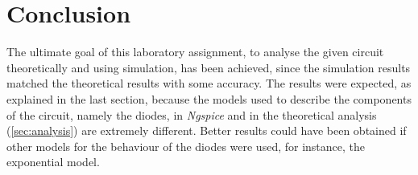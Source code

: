 %             
%             







\section{Conclusion}
\label{sec:conclusion}


The ultimate goal of this laboratory assignment, to analyse
the given circuit theoretically and using simulation, has been achieved, since
the simulation results matched the theoretical results with some accuracy.
The results were expected, as explained in the last section, because
the models used to describe the components of the circuit, namely the diodes,
in \textit{Ngspice} and in the theoretical analysis (\ref{sec:analysis}) are
extremely different. Better results could have been obtained if other
models for the behaviour of the diodes were used, for instance, the
exponential model.

